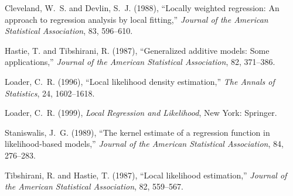 \begin{thebibliography}{}

{Cleveland, W.~S. and Devlin, S.~J.} (1988),
 ``Locally weighted regression: {A}n approach to regression analysis by  local fitting,''
 {\it Journal of the American Statistical Association}, 83, 596--610.

{Hastie, T. and Tibshirani, R.} (1987),
 ``Generalized additive models: {S}ome applications,''
 {\it Journal of the American Statistical Association}, 82, 371--386.

{Loader, C.~R.} (1996),
 ``Local likelihood density estimation,''
 {\it The Annals of Statistics}, 24, 1602--1618.

 {Loader, C.~R.} (1999),
 {\it Local Regression and Likelihood}, New York:
 Springer.

{Staniswalis, J.~G.} (1989),
 ``The kernel estimate of a regression function in likelihood-based
  models,''
 {\it Journal of the American Statistical Association},
  84, 276--283.


{Tibshirani, R. and Hastie, T.} (1987),
 ``Local likelihood estimation,''
 {\it Journal of the American Statistical Association}, 82, 559--567.

\end{thebibliography}
